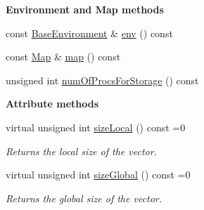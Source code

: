 \begin{Indent}{\bf Environment and Map methods}\par
\begin{DoxyCompactItemize}
\item 
const \hyperlink{class_q_u_e_s_o_1_1_base_environment}{Base\-Environment} \& \hyperlink{class_q_u_e_s_o_1_1_vector_a2e2952dab0554fedd8dc9a2543715745}{env} () const 
\item 
const \hyperlink{class_q_u_e_s_o_1_1_map}{Map} \& \hyperlink{class_q_u_e_s_o_1_1_vector_a0cbedc1f6e24c0ad3b688d201fd649a4}{map} () const 
\item 
unsigned int \hyperlink{class_q_u_e_s_o_1_1_vector_a4dab068a8b5cedef00b8520c4e106a2b}{num\-Of\-Procs\-For\-Storage} () const 
\end{DoxyCompactItemize}
\end{Indent}
\begin{Indent}{\bf Attribute methods}\par
\begin{DoxyCompactItemize}
\item 
virtual unsigned int \hyperlink{class_q_u_e_s_o_1_1_vector_adf48150d839ad2b6ca24221df6aaa3ef}{size\-Local} () const =0
\begin{DoxyCompactList}\small\item\em Returns the local size of the vector. \end{DoxyCompactList}\item 
virtual unsigned int \hyperlink{class_q_u_e_s_o_1_1_vector_ae22a3f92ec2dfcec49b4def6c7d0b306}{size\-Global} () const =0
\begin{DoxyCompactList}\small\item\em Returns the global size of the vector. \end{DoxyCompactList}\end{DoxyCompactItemize}
\end{Indent}
